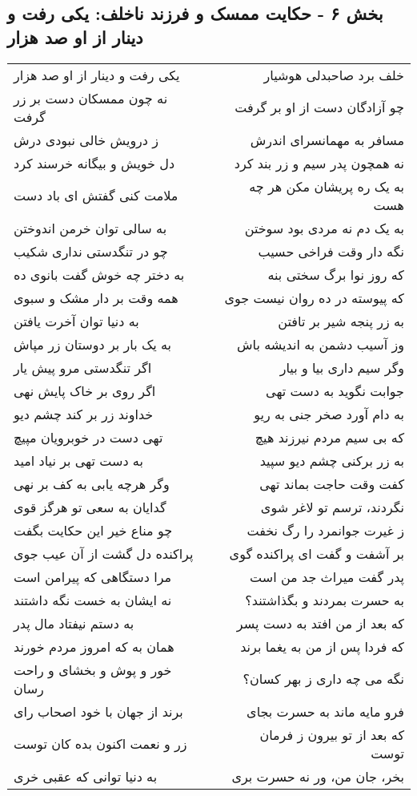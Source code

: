 \begin{center}
\section*{بخش ۶ - حکایت ممسک و فرزند ناخلف: یکی رفت و دینار از او صد هزار}
\label{sec:006}
\begin{longtable}{l p{0.5cm} r}
یکی رفت و دینار از او صد هزار
&&
خلف برد صاحبدلی هوشیار
\\
نه چون ممسکان دست بر زر گرفت
&&
چو آزادگان دست از او بر گرفت
\\
ز درویش خالی نبودی درش
&&
مسافر به مهمانسرای اندرش
\\
دل خویش و بیگانه خرسند کرد
&&
نه همچون پدر سیم و زر بند کرد
\\
ملامت کنی گفتش ای باد دست
&&
به یک ره پریشان مکن هر چه هست
\\
به سالی توان خرمن اندوختن
&&
به یک دم نه مردی بود سوختن
\\
چو در تنگدستی نداری شکیب
&&
نگه دار وقت فراخی حسیب
\\
به دختر چه خوش گفت بانوی ده
&&
که روز نوا برگ سختی بنه
\\
همه وقت بر دار مشک و سبوی
&&
که پیوسته در ده روان نیست جوی
\\
به دنیا توان آخرت یافتن
&&
به زر پنجه شیر بر تافتن
\\
به یک بار بر دوستان زر مپاش
&&
وز آسیب دشمن به اندیشه باش
\\
اگر تنگدستی مرو پیش یار
&&
وگر سیم داری بیا و بیار
\\
اگر روی بر خاک پایش نهی
&&
جوابت نگوید به دست تهی
\\
خداوند زر بر کند چشم دیو
&&
به دام آورد صخر جنی به ریو
\\
تهی دست در خوبرویان مپیچ
&&
که بی سیم مردم نیرزند هیچ
\\
به دست تهی بر نیاد امید
&&
به زر برکنی چشم دیو سپید
\\
وگر هرچه یابی به کف بر نهی
&&
کفت وقت حاجت بماند تهی
\\
گدایان به سعی تو هرگز قوی
&&
نگردند، ترسم تو لاغر شوی
\\
چو مناع خیر این حکایت بگفت
&&
ز غیرت جوانمرد را رگ نخفت
\\
پراکنده دل گشت از آن عیب جوی
&&
بر آشفت و گفت ای پراکنده گوی
\\
مرا دستگاهی که پیرامن است
&&
پدر گفت میراث جد من است
\\
نه ایشان به خست نگه داشتند
&&
به حسرت بمردند و بگذاشتند؟
\\
به دستم نیفتاد مال پدر
&&
که بعد از من افتد به دست پسر
\\
همان به که امروز مردم خورند
&&
که فردا پس از من به یغما برند
\\
خور و پوش و بخشای و راحت رسان
&&
نگه می چه داری ز بهر کسان؟
\\
برند از جهان با خود اصحاب رای
&&
فرو مایه ماند به حسرت بجای
\\
زر و نعمت اکنون بده کان توست
&&
که بعد از تو بیرون ز فرمان توست
\\
به دنیا توانی که عقبی خری
&&
بخر، جان من، ور نه حسرت بری
\\
\end{longtable}
\end{center}
